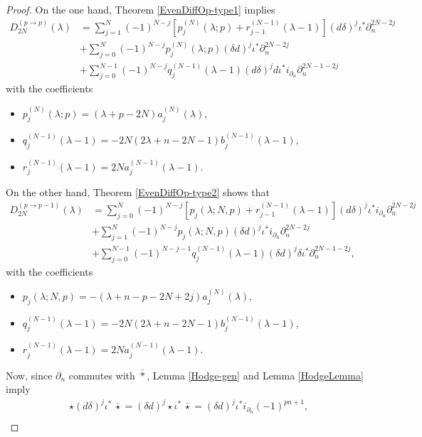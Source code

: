 \documentclass[a4paper,12pt,reqno]{amsart}
\numberwithin{theorem}{subsection}
\numberwithin{equation}{section}
\begin{document}
\begin{proof} On the one hand, Theorem \ref{EvenDiffOp-type1} implies
\begin{align*}
   D^{(p \to p)}_{2N}(\lambda) & = \sum_{j=1}^N (-1)^{N-j}
   \left[p_j^{(N)}(\lambda;p) + r_{j-1}^{(N-1)}(\lambda\!-\!1)\right] ({d}\delta)^j \iota^*\partial_n^{2N-2j} \\
   & + \sum_{j=0}^N(-1)^{N-j} p_j^{(N)}(\lambda;p) (\delta{d})^j \iota^*\partial_n^{2N-2j}\\
   & + \sum_{j=0}^{N-1}(-1)^{N-j} q_j^{(N-1)}(\lambda\!-\!1) ({d}\delta)^j {d}
   \iota^*i_{\partial_n} \partial_n^{2N-1-2j}
\end{align*}
with the coefficients
\begin{itemize}
   \item $p_j^{(N)}(\lambda;p) = (\lambda\!+\!p\!-\!2N) a_j^{(N)}(\lambda)$,
   \item $q_j^{(N-1)}(\lambda\!-\!1) = -2N(2\lambda\!+\!n\!-\!2N\!-\!1) b_j^{(N-1)}(\lambda\!-\!1)$,
   \item $r_j^{(N-1)}(\lambda\!-\!1) = 2N  a_j^{(N-1)}(\lambda\!-\!1)$.
\end{itemize}
On the other hand, Theorem \ref{EvenDiffOp-type2} shows that
\begin{align*}
   D^{(p\to p-1)}_{2N}(\lambda) & =
   \sum_{j=0}^N(-1)^{N-j} \left[p_j(\lambda;N,p) + r_{j-1}^{(N-1)}(\lambda\!-\!1)\right]
   ({d}\delta)^j \iota^*i_{\partial_n} \partial_n^{2N-2j} \\
   & + \sum_{j=1}^N(-1)^{N-j} p_j(\lambda;N,p) (\delta{d})^j \iota^* i_{\partial_n} \partial_n^{2N-2j} \\
   & + \sum_{j=0}^{N-1}(-1)^{N-j-1} q_j^{(N-1)}(\lambda\!-\!1) (\delta{d})^j \delta
   \iota^*\partial_n^{2N-1-2j},
\end{align*}
with the coefficients
\begin{itemize}
   \item  $p_j(\lambda;N,p) = -(\lambda\!+\!n\!-\!p\!-\!2N\!+\!2j) a_j^{(N)}(\lambda)$,
   \item  $q_j^{(N-1)}(\lambda\!-\!1) = -2N(2\lambda\!+\!n\!-\!2N\!-\!1) b_j^{(N-1)}(\lambda\!-\!1)$,
   \item  $r_j^{(N-1)}(\lambda\!-\!1) = 2N  a_j^{(N-1)}(\lambda\!-\!1)$.
\end{itemize}
Now, since $\partial_n$ commutes with $\bar{*}$, Lemma \ref{Hodge-gen} and
Lemma \ref{HodgeLemma} imply
\begin{align*}
   & \star ({d} \delta)^j \iota^* \, \bar{\star}
   = (\delta {d} )^j \star \iota^* \, \bar{\star} = (\delta {d})^j \iota^* i_{\partial_n} (-1)^{pn+1}, \\

\end{align*}
\end{proof}
\end{document}
